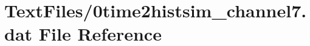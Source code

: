 \hypertarget{0time2histsim__channel7_8dat}{}\section{Text\+Files/0time2histsim\+\_\+channel7.dat File Reference}
\label{0time2histsim__channel7_8dat}
